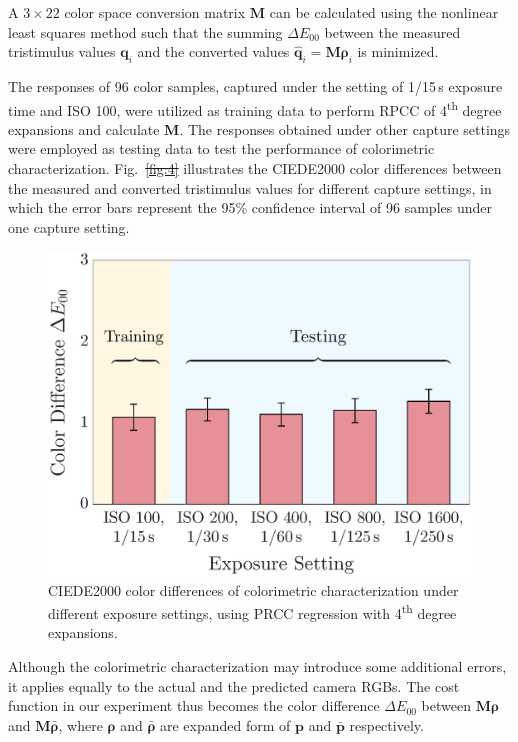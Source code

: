\documentclass[9pt,twocolumn,twoside]{osajnl}
\providecommand{\DIFadd}[1]{{\protect\color{blue}\uwave{#1}}} %
\providecommand{\DIFdel}[1]{{\protect\color{red}\sout{#1}}}                      %
\providecommand{\DIFaddbegin}{} %
\providecommand{\DIFaddend}{} %
\providecommand{\DIFdelbegin}{} %
\providecommand{\DIFdelend}{} %
\providecommand{\DIFaddbeginFL}{} %
\providecommand{\DIFaddendFL}{} %
\providecommand{\DIFdelbeginFL}{} %
\providecommand{\DIFdelendFL}{} %
\begin{document}
A $3\times22$ color space conversion matrix $\mathbf{M}$ can be calculated using the nonlinear least squares method such that the summing $\Delta{}E_{00}$ between the measured tristimulus values $\mathbf{q}_i$ and the converted values $\hat{\mathbf{q}}_i = \mathbf{M}\boldsymbol{\rho}_i$ is minimized.

The responses of 96 color samples, captured under the setting of 1/15\,s exposure time and ISO 100, were utilized as training data to perform RPCC of 4\textsuperscript{th} degree expansions and calculate $\mathbf{M}$. The responses obtained under other capture settings were employed as testing data to test the performance of colorimetric characterization. Fig.~\DIFdelbegin \DIFdel{\ref{fig:4} }\DIFdelend \DIFaddbegin \DIFadd{\ref{fig:5} }\DIFaddend illustrates the CIEDE2000 color differences between the measured and converted tristimulus values for different capture settings, in which the error bars represent the 95\% confidence interval of 96 samples under one capture setting.

\begin{figure}[tbp]
	\centering
	\DIFdelbeginFL %
\DIFdelendFL \DIFaddbeginFL \includegraphics[width=.75\linewidth]{Fig5}
	\DIFaddendFL \caption{CIEDE2000 color differences of colorimetric characterization under different exposure settings, using PRCC regression with 4\textsuperscript{th} degree expansions.}
	\DIFdelbeginFL %
\DIFdelendFL \DIFaddbeginFL \label{fig:5}
\DIFaddendFL \end{figure}

Although the colorimetric characterization may introduce some additional errors, it applies equally to the actual and the predicted camera RGBs. The cost function in our experiment thus becomes the color difference $\Delta{}E_{00}$ between $\mathbf{M}\boldsymbol{\rho}$ and $\mathbf{M}\bar{\boldsymbol{\rho}}$, where $\boldsymbol{\rho}$ and $\bar{\boldsymbol{\rho}}$ are expanded form of $\mathbf{p}$ and $\bar{\mathbf{p}}$ respectively.
\end{document}
